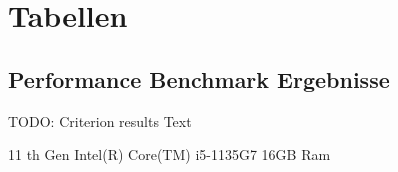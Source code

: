 \chapter{Tabellen}
\label{anhang:chapter-tabellen}

\section{Performance Benchmark Ergebnisse}
\label{anhang:section-tabellen-benchmark}

TODO: Criterion results Text

11 th Gen Intel(R) Core(TM) i5-1135G7
16GB Ram






